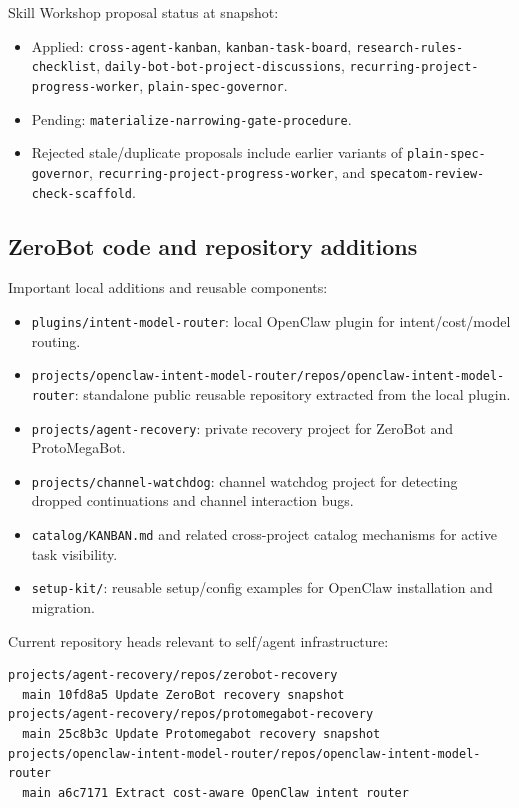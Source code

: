 \documentclass[11pt]{article}
\begin{document}
Skill Workshop proposal status at snapshot:
\begin{itemize}
  \item Applied: \texttt{cross-agent-kanban}, \texttt{kanban-task-board}, \texttt{research-rules-checklist}, \texttt{daily-bot-bot-project-discussions}, \texttt{recurring-project-progress-worker}, \texttt{plain-spec-governor}.
  \item Pending: \texttt{materialize-narrowing-gate-procedure}.
  \item Rejected stale/duplicate proposals include earlier variants of \texttt{plain-spec-governor}, \texttt{recurring-project-progress-worker}, and \texttt{specatom-review-check-scaffold}.
\end{itemize}

\subsection{ZeroBot code and repository additions}

Important local additions and reusable components:
\begin{itemize}
  \item \texttt{plugins/intent-model-router}: local OpenClaw plugin for intent/cost/model routing.
  \item \texttt{projects/openclaw-intent-model-router/repos/openclaw-intent-model-router}: standalone public reusable repository extracted from the local plugin.
  \item \texttt{projects/agent-recovery}: private recovery project for ZeroBot and ProtoMegaBot.
  \item \texttt{projects/channel-watchdog}: channel watchdog project for detecting dropped continuations and channel interaction bugs.
  \item \texttt{catalog/KANBAN.md} and related cross-project catalog mechanisms for active task visibility.
  \item \texttt{setup-kit/}: reusable setup/config examples for OpenClaw installation and migration.
\end{itemize}

Current repository heads relevant to self/agent infrastructure:
\begin{verbatim}
projects/agent-recovery/repos/zerobot-recovery
  main 10fd8a5 Update ZeroBot recovery snapshot
projects/agent-recovery/repos/protomegabot-recovery
  main 25c8b3c Update Protomegabot recovery snapshot
projects/openclaw-intent-model-router/repos/openclaw-intent-model-router
  main a6c7171 Extract cost-aware OpenClaw intent router
\end{verbatim}
\end{document}
